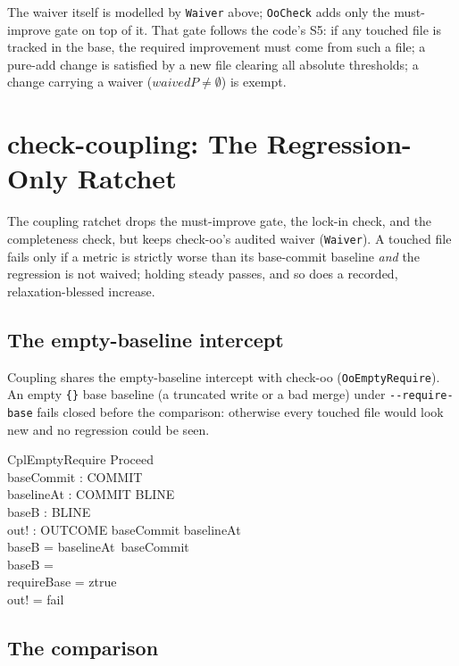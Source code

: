 \documentclass[a4paper,10pt,fleqn]{article}
\begin{document}
The waiver itself is modelled by \texttt{Waiver} above; \texttt{OoCheck} adds
only the must-improve gate on top of it. That gate follows the code's S5: if any
touched file is tracked in the base, the required improvement must come from
such a file; a pure-add change is satisfied by a new file clearing all absolute
thresholds; a change carrying a waiver ($\mathit{waivedP} \neq \emptyset$) is
exempt.

\section{check-coupling: The Regression-Only Ratchet}

The coupling ratchet drops the must-improve gate, the lock-in check, and the
completeness check, but keeps check-oo's audited waiver (\texttt{Waiver}). A
touched file fails only if a metric is strictly worse than its base-commit
baseline \emph{and} the regression is not waived; holding steady passes, and so
does a recorded, relaxation-blessed increase.

\subsection{The empty-baseline intercept}

Coupling shares the empty-baseline intercept with check-oo
(\texttt{OoEmptyRequire}). An empty \texttt{\{\}} base baseline (a truncated
write or a bad merge) under \texttt{-{}-require-base} fails closed before the
comparison: otherwise every touched file would look new and no regression
could be seen.

\begin{schema}{CplEmptyRequire}
Proceed \\
baseCommit : COMMIT \\
baselineAt : COMMIT \pfun BLINE \\
baseB : BLINE \\
out! : OUTCOME
\where
baseCommit \in \dom baselineAt \\
baseB = baselineAt~baseCommit \\
baseB = \emptyset \\
requireBase = ztrue \\
out! = fail
\end{schema}

\subsection{The comparison}
\end{document}
